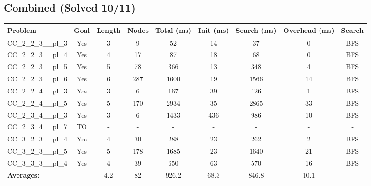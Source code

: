 \documentclass{article}
\begin{document}
\subsection*{Combined (Solved 10/11)}
\begin{tabular}{lcccccccc}
\toprule
Problem & Goal & Length & Nodes & Total (ms) & Init (ms) & Search (ms) & Overhead (ms) & Search \\
\midrule
CC\_2\_2\_3\_\_pl\_3 & Yes & 3 & 9 & 52 & 14 & 37 & 0 & BFS \\
CC\_2\_2\_3\_\_pl\_4 & Yes & 4 & 17 & 87 & 18 & 68 & 0 & BFS \\
CC\_2\_2\_3\_\_pl\_5 & Yes & 5 & 78 & 366 & 13 & 348 & 4 & BFS \\
CC\_2\_2\_3\_\_pl\_6 & Yes & 6 & 287 & 1600 & 19 & 1566 & 14 & BFS \\
CC\_2\_2\_4\_\_pl\_3 & Yes & 3 & 6 & 167 & 39 & 126 & 1 & BFS \\
CC\_2\_2\_4\_\_pl\_5 & Yes & 5 & 170 & 2934 & 35 & 2865 & 33 & BFS \\
CC\_2\_3\_4\_\_pl\_3 & Yes & 3 & 6 & 1433 & 436 & 986 & 10 & BFS \\
CC\_2\_3\_4\_\_pl\_7 & TO & - & - & - & - & - & - & - \\
CC\_3\_2\_3\_\_pl\_4 & Yes & 4 & 30 & 288 & 23 & 262 & 2 & BFS \\
CC\_3\_2\_3\_\_pl\_5 & Yes & 5 & 178 & 1685 & 23 & 1640 & 21 & BFS \\
CC\_3\_3\_3\_\_pl\_4 & Yes & 4 & 39 & 650 & 63 & 570 & 16 & BFS \\
\textbf{Averages:} & & 4.2 & 82 & 926.2 & 68.3 & 846.8 & 10.1 & \\
\bottomrule
\end{tabular}
\\[0.7cm]
\end{document}
